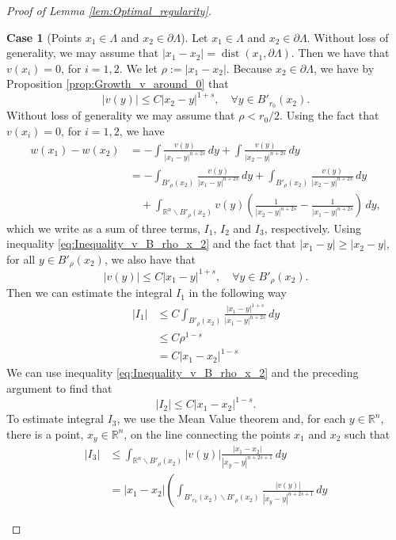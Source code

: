 \documentclass[11pt,reqno]{amsart}
\theoremstyle{definition}
\newtheorem{case}{Case}
\theoremstyle{remark}
\begin{document}
\begin{proof}[Proof of Lemma \ref{lem:Optimal_regularity}]
\begin{case}[Points $x_1\in\Lambda$ and $x_2\in\partial\Lambda$]
\label{case:One_point_in_Lambda_one_point_on_boundary}
Let $x_1\in\Lambda$ and $x_2\in\partial\Lambda$. Without loss of generality, we may assume that $|x_1-x_2|={\operatorname{dist}}(x_1,\partial\Lambda)$. Then we have that $v(x_i)=0$, for $i=1,2$. We let $\rho:=|x_1-x_2|$. Because $x_2\in\partial\Lambda$, we have by Proposition \ref{prop:Growth_v_around_0} that
\begin{equation}
\label{eq:Inequality_v_B_rho_x_2}
|v(y)| \leq C|x_2-y|^{1+s},\quad\forall y \in B'_{r_0}(x_2).
\end{equation}
Without loss of generality we may assume that $\rho<r_0/2$. Using the fact that $v(x_i)=0$, for $i=1,2$, we have
\begin{align*}
w(x_1)-w(x_2)&=-\int\frac{v(y)}{|x_1-y|^{n+2s}}\, dy + \int\frac{v(y)}{|x_2-y|^{n+2s}}\, dy\\
&=-\int_{B'_{\rho}(x_2)}\frac{v(y)}{|x_1-y|^{n+2s}}\, dy +\int_{B'_{\rho}(x_2)}\frac{v(y)}{|x_2-y|^{n+2s}}\, dy\\
&\quad+\int_{{\mathbb{R}}^n\backslash B'_{\rho}(x_2)}v(y)\left(\frac{1}{|x_2-y|^{n+2s}}-\frac{1}{|x_1-y|^{n+2s}}\right)\, dy,
\end{align*}
which we write as a sum of three terms, $I_1$, $I_2$ and $I_3$, respectively. Using inequality \eqref{eq:Inequality_v_B_rho_x_2} and the fact that $|x_1-y|\geq |x_2-y|$, for all $y\in B'_{\rho}(x_2)$, we also have that
$$
|v(y)| \leq C|x_1-y|^{1+s},\quad\forall y \in B'_{\rho}(x_2).
$$
Then we can estimate the integral $I_1$ in the following way
\begin{align*}
|I_1| &\leq C\int_{B'_{\rho}(x_2)} \frac{|x_1-y|^{1+s}}{|x_1-y|^{n+2s}}\, dy\\
& \leq C \rho^{1-s}\\
& = C |x_1-x_2|^{1-s} 
\end{align*}
We can use inequality \eqref{eq:Inequality_v_B_rho_x_2} and the preceding argument to find that 
$$
|I_2| \leq C |x_1-x_2|^{1-s}.
$$
To estimate integral $I_3$, we use the Mean Value theorem and, for each $y\in {\mathbb{R}}^n$, there is a point, $x_y \in{\mathbb{R}}^n$, on the line connecting the points $x_1$ and $x_2$ such that 
\begin{align*}
|I_3| &\leq \int_{{\mathbb{R}}^n\backslash B'_{\rho}(x_2)}|v(y)| \frac{|x_1-x_2|}{|x_y-y|^{n+2s+1}}\, dy\\
&= |x_1-x_2|\left(\int_{B'_{r_0}(x_2)\backslash B'_{\rho}(x_2)} \frac{|v(y)|}{|x_y-y|^{n+2s+1}}\, dy

\end{align*}
\end{case}
\end{proof}
\end{document}
